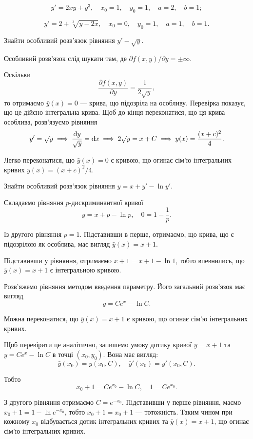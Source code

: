 \begin{problem}
	\[y'=2xy+y^3,\quad x_0=1, \quad y_0=1,\quad a=2,\quad b=1;\]
\end{problem}

\begin{problem}
	\[y'=2+\sqrt[3]{y-2x},\quad x_0=0, \quad y_0=1,\quad a=1,\quad b=1.\]
\end{problem}

\begin{example}
	Знайти особливий розв'язок рівняння $y' - \sqrt{y}$.
\end{example}

\begin{solution}
	Особливий розв'язок слід шукати там, де $\partial f(x,y)/\partial y=\pm\infty$. \parvskip
	
	Оскільки \[\frac{\partial f(x,y)}{\partial y}=\frac{1}{2\sqrt{y}},\] то отримаємо $\bar y(x)=0$ --- крива, що підозріла на особливу. Перевірка показує, що це дійсно інтегральна крива. Щоб до кінця переконатися, що ця крива особлива, розв'язуємо рівняння \[y'=\sqrt{y}\implies \frac{\mathop{}\!\mathrm{d} y}{\sqrt{y}}=\mathop{}\!\mathrm{d} x\implies 2\sqrt{y}=x+C\implies y(x)=\frac{(x+c)^2}{4}.\]

	Легко переконатися, що $\bar y(x)=0$ є кривою, що огинає сім'ю інтегральних кривих $y(x)=(x+c)^2/4$. 
\end{solution}

\begin{example}
	Знайти особливий розв'язок рівняння $y = x + y' - \ln y'$.
\end{example}

\begin{solution}
	Складаємо рівняння $p$-дискриминантної кривої \[ y = x + p - \ln p, \quad 0 = 1 - \frac{1}{p}.\]

	 Із другого рівняння $p=1$. Підставивши в перше, отримаємо, що крива, що є підозрілою як особлива, має вигляд $\bar y(x)=x+1$. \parvskip

	Підставивши у рівняння, отримаємо $x + 1=x+1-\ln 1$, тобто впевнились, що $\bar y(x)=x+1$ є інтегральною кривою. \parvskip

	Роз\-в'яж\-е\-мо рівняння методом введення параметру. Його загальний роз\-в'яз\-ок має вигляд \[y=Ce^x-\ln C.\]

	 Можна переконатися, що $\bar y(x)=x+1$ є кривою, що огинає сім'ю інтегральних кривих. \parvskip

	Щоб перевірити це аналітично, запишемо умову дотику кривої $y=x+1$ та $y=Ce^x-\ln C$ в точці $(x_0,y_0)$. Вона має вигляд: \[ \bar y(x_0) = y(x_0, C), \quad \bar{y}'(x_0) = y'(x_0,C).\] 

	Тобто \[x_0+1=Ce^{x_0}-\ln C, \quad 1 = Ce^{x_0}.\]

	З другого рівняння отримаємо $C = e^{-x_0}$. Підставивши у перше рівняння, маємо $x_0 + 1 = 1 - \ln e^{-x_0}$, тобто $x_0+1=x_0+1$ --- тотожність. Таким чином при кожному $x_0$ відбувається дотик інтегральних кривих та $\bar y(x)=x+1$, що огинає сім'ю інтегральних кривих.
\end{solution}

